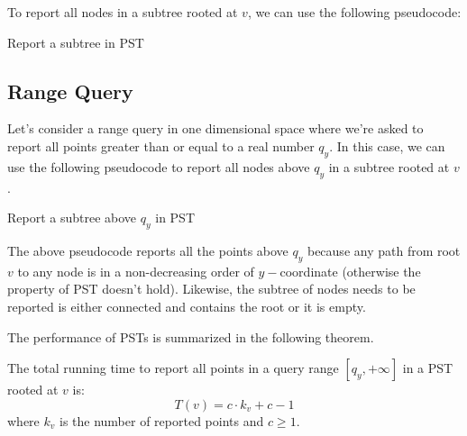 To report all nodes in a subtree rooted at $v$, we can use the following pseudocode:
\begin{algorithm}[H]
\caption{Report a subtree in PST}\label{Report_subtree1}
\begin{algorithmic}[1]
    \State {}
    \State {}
    \State {}
\EndIf
\EndFunction
\end{algorithmic}
\end{algorithm}

\subsection{Range Query}
Let's consider a range query in one dimensional space where we're asked to report all points greater than or equal to a real number $q_y$. In this case, we can use the following pseudocode to report all nodes above $q_y$ in a subtree rooted at $v$.
\begin{algorithm}[H]
\caption{Report a subtree above $q_y$ in PST}\label{Report_subtree2}
\begin{algorithmic}[1]
        \State {}
        \State {}
        \State {}
    \EndIf
\EndIf
\EndFunction
\end{algorithmic}
\end{algorithm}
The above pseudocode reports all the points above $q_y$ because any path from root $v$ to any node is in a non-decreasing order of $y-$coordinate (otherwise the property of PST doesn't hold). Likewise, the subtree of nodes needs to be reported is either connected and contains the root or it is empty.

The performance of PSTs is summarized in the following theorem.
\begin{theorem}\label{theorem1:RQ}
The total running time to report all points in a query range $[q_y, +\infty]$ in a PST rooted at $v$ is:
\begin{equation*}
    T(v) = c\cdot k_v + c - 1
\end{equation*}
where $k_v$ is the number of reported points and $c \geq 1$.
\end{theorem}

